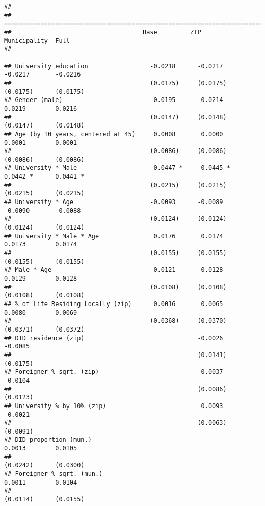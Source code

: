 \documentclass[
]{article}
\begin{document}
\begin{verbatim}
## 
## ======================================================================================
##                                    Base         ZIP          Municipality  Full       
## --------------------------------------------------------------------------------------
## University education                 -0.0218      -0.0217      -0.0217       -0.0216  
##                                      (0.0175)     (0.0175)     (0.0175)      (0.0175) 
## Gender (male)                         0.0195       0.0214       0.0219        0.0216  
##                                      (0.0147)     (0.0148)     (0.0147)      (0.0148) 
## Age (by 10 years, centered at 45)     0.0008       0.0000       0.0001        0.0001  
##                                      (0.0086)     (0.0086)     (0.0086)      (0.0086) 
## University * Male                     0.0447 *     0.0445 *     0.0442 *      0.0441 *
##                                      (0.0215)     (0.0215)     (0.0215)      (0.0215) 
## University * Age                     -0.0093      -0.0089      -0.0090       -0.0088  
##                                      (0.0124)     (0.0124)     (0.0124)      (0.0124) 
## University * Male * Age               0.0176       0.0174       0.0173        0.0174  
##                                      (0.0155)     (0.0155)     (0.0155)      (0.0155) 
## Male * Age                            0.0121       0.0128       0.0129        0.0128  
##                                      (0.0108)     (0.0108)     (0.0108)      (0.0108) 
## % of Life Residing Locally (zip)      0.0016       0.0065       0.0080        0.0069  
##                                      (0.0368)     (0.0370)     (0.0371)      (0.0372) 
## DID residence (zip)                               -0.0026                    -0.0085  
##                                                   (0.0141)                   (0.0175) 
## Foreigner % sqrt. (zip)                           -0.0037                    -0.0104  
##                                                   (0.0086)                   (0.0123) 
## University % by 10% (zip)                          0.0093                    -0.0021  
##                                                   (0.0063)                   (0.0091) 
## DID proportion (mun.)                                           0.0013        0.0105  
##                                                                (0.0242)      (0.0300) 
## Foreigner % sqrt. (mun.)                                        0.0011        0.0104  
##                                                                (0.0114)      (0.0155) 

\end{verbatim}
\end{document}
